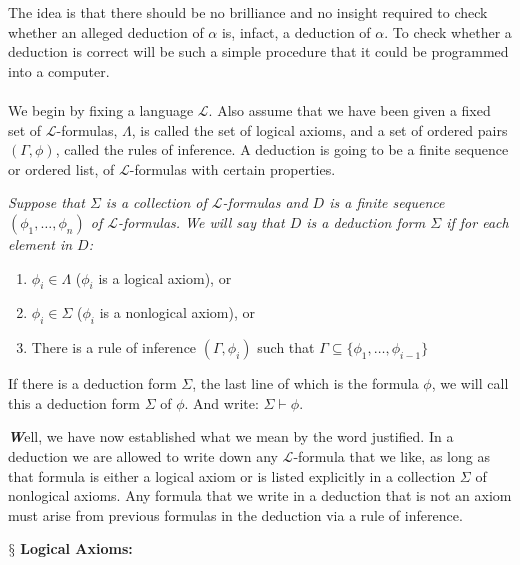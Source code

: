 \documentclass[10pt,a4paper]{article}
\newenvironment{callout}
	{\begin{calloutbox}\color{charcoal}\textbf\textit}
	{\end{calloutbox}}
\newcommand{\newpoint}[1]{\indent$\mathsection$ \textbf{#1}}
\newcommand{\curveL}{\mathcal{L}}
\begin{document}
                    The idea is that there should be no brilliance and no insight required to check whether an alleged deduction of $\alpha$ is, infact, a deduction of $\alpha$. To check whether a deduction is correct will be such a simple procedure that it could be programmed into a computer.
                    \\
                    \\
                    We begin by fixing a language $\curveL$. Also assume that we have been given a fixed set of $\curveL$-formulas, $\Lambda$, is called the set of logical axioms, and a set of ordered pairs $(\Gamma, \phi)$, called the rules of inference. A deduction is going to be a finite sequence or ordered list, of $\curveL$-formulas with certain properties.
                    \begin{define}
                        \textit{Suppose that $\Sigma$ is a collection of $\curveL$-formulas and $D$ is a finite sequence $(\phi_1, \dots, \phi_n)$ of $\curveL$-formulas. We will say that $D$ is a deduction form $\Sigma$ if for each element in $D$:}
                        \begin{enumerate}
                            \item $\phi_i\in\Lambda$ ($\phi_i$ is a logical axiom), or
                            \item $\phi_i\in\Sigma$ ($\phi_i$ is a nonlogical axiom), or
                            \item There is a rule of inference $(\Gamma,\phi_i)$ such that $\Gamma\subseteq\{\phi_1,\dots,\phi_{i-1}\}$
                        \end{enumerate}
                    \end{define}
                        If there is a deduction form $\Sigma$, the last line of which is the formula $\phi$, we will call this a deduction form $\Sigma$ of $\phi$. And write: $\Sigma\vdash\phi$.
                        \begin{callout}
                            Well, we have now established what we mean by the word justified. In a deduction we are allowed to write down any $\curveL$-formula that we like, as long as that formula is either a logical axiom or is listed explicitly in a collection $\Sigma$ of nonlogical axioms. Any formula that we write in a deduction that is not an axiom must arise from previous formulas in the deduction via a rule of inference.
                        \end{callout}
                        \newpoint{Logical Axioms:}





                    

                


                    \newpage
                    
                    
            
\end{document}
